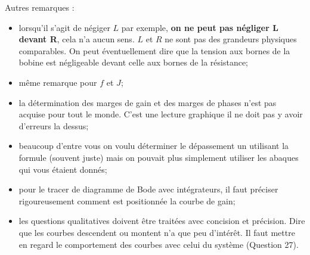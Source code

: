 \documentclass[10pt,fleqn]{article} %
\begin{document}
Autres remarques : 
\begin{itemize}
\item lorsqu'il s'agit de négiger $L$ par exemple, \textbf{on ne peut pas négliger L devant R}, cela n'a aucun sens. $L$ et $R$ ne sont pas des grandeurs physiques comparables. On peut éventuellement dire que la tension aux bornes de la bobine est négligeable devant celle aux bornes de la résistance;
\item même remarque pour $f$ et $J$;
\item la détermination des marges de gain et des marges de phases n'est pas acquise pour tout le monde. C'est une lecture graphique il ne doit pas y avoir d'erreurs la dessus;
\item beaucoup d'entre vous on voulu déterminer le dépassement un utilisant la formule (souvent juste) mais on pouvait plus simplement utiliser les abaques qui vous étaient donnés;
\item pour le tracer de diagramme de Bode avec intégrateurs, il faut préciser rigoureusement comment est positionnée la courbe de gain;
\item les questions qualitatives doivent être traitées avec concision et précision. Dire que les courbes descendent ou montent n'a que peu d'intérêt. Il faut mettre en regard le comportement des courbes avec celui du système (Question 27).
\end{itemize}






%
\end{document}
